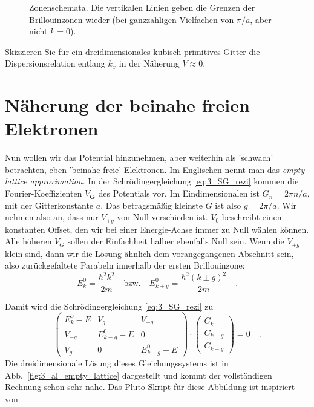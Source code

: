 \begin{figure}
   \caption{Zonenschemata. Die vertikalen Linien geben die Grenzen der Brillouinzonen wieder (bei ganzzahligen Vielfachen von $\pi/a$, aber nicht $k=0$). \label{fig:3_zone_scheme}}
\end{figure}

\begin{questions}
    \item Skizzieren Sie für ein dreidimensionales kubisch-primitives Gitter die Dispersionsrelation entlang $k_x$ in der Näherung $V \approx 0$.
\end{questions}



\section{Näherung der beinahe freien Elektronen}



Nun wollen wir das Potential hinzunehmen, aber weiterhin als 'schwach' betrachten, eben 'beinahe freie' Elektronen. Im Englischen  nennt man das \emph{empty lattice approximation}. In der Schrödingergleichung \ref{eq:3_SG_rezi} kommen die Fourier-Koeffizienten $V_\mathbf{G}$ des Potentials vor. Im Eindimensionalen ist $G_n = 2 \pi n / a$, mit der Gitterkonstante $a$. Das betragsmäßig kleinste $G$ ist also $g = 2 \pi / a$. Wir nehmen also an, dass nur $V_{\pm g}$ von Null verschieden ist. $V_0$ beschreibt einen konstanten Offset, den wir bei einer Energie-Achse immer zu Null wählen können. Alle höheren $V_G$ sollen der Einfachheit halber ebenfalls Null sein.  Wenn die $V_{\pm g}$ klein sind, dann wir die Lösung ähnlich dem vorangegangenen Abschnitt sein, also zurückgefaltete Parabeln innerhalb der ersten Brillouinzone:
\begin{equation}
    E_k^0 =  \frac{\hbar^2 k^2}{2m} \quad \text{bzw.} \quad    E_{k \pm g}^0 =  \frac{\hbar^2 (k  \pm g)^2}{2m}  \quad .
\end{equation}

Damit wird die Schrödingergleichung \ref{eq:3_SG_rezi} zu
\begin{equation}
   \begin{pmatrix}
    E_k^0 - E &  V_{g} &  V_{-g} \\
    V_{-g}  &   E_{k - g}^0 - E & 0  \\
    V_{g}  &  0 &     E_{k + g}^0 - E  
\end{pmatrix}
  \cdot
  \begin{pmatrix}
    C_{k} \\  C_{k - g} \\  C_{k + g}
  \end{pmatrix}
 = 0  \quad . 
 \label{eq:3_SG_empty_lattice} 
\end{equation}
Die dreidimensionale Lösung dieses Gleichungssystems ist in Abb.~\ref{fig:3_al_empty_lattice} dargestellt und kommt der vollständigen Rechnung schon sehr nahe. Das Pluto-Skript für diese Abbildung ist inspiriert von \cite{Polakovic_cmpm3}.

